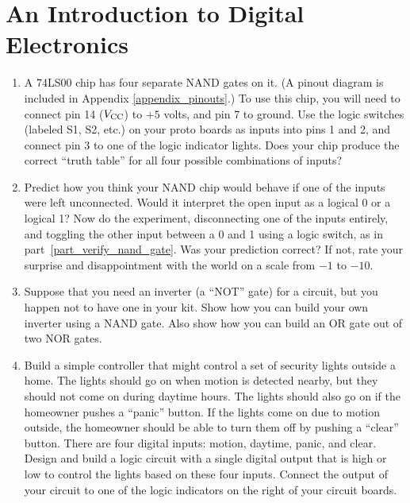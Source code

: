 \section{An Introduction to Digital Electronics}
\label{lab_digital_electronics}
\pagestyle{labfancy} %

\bigskip

\begin{enumerate}[wide]

\item A 74LS00 chip has four separate NAND gates on it.  (A pinout diagram is included in Appendix \ref{appendix_pinouts}.) To use this chip, you will need to connect pin 14 ($V_{\rm CC}$) to $+5$ volts, and pin 7 to ground.  Use the logic switches (labeled S1, S2, etc.) on your proto boards as inputs into pins 1 and 2, and connect pin 3 to one of the logic indicator lights.  Does your chip produce the correct ``truth table'' for all four possible combinations of inputs?\label{part_verify_nand_gate}

\item Predict how you think your NAND chip would behave if one of the inputs were left unconnected.  Would it interpret the open input as a logical 0 or a logical 1?  Now do the experiment, disconnecting one of the inputs entirely, and toggling the other input between a 0 and 1 using a logic switch, as in part~\ref{part_verify_nand_gate}.  Was your prediction correct?  If not, rate your surprise and disappointment with the world on a scale from $-1$ to $-10$. \label{part_open_digital_inputs}

\item Suppose that you need an inverter (a ``NOT'' gate) for a circuit, but you happen not to have one in your kit.  Show how you can build your own inverter using a NAND gate.  Also show how you can build an OR gate out of two NOR gates.

\item Build a simple controller that might control a set of security lights outside a home.  The lights should go on when motion is detected nearby, but they should not come on during daytime hours.  The lights should also go on if the homeowner pushes a ``panic'' button.  If the lights come on due to motion outside, the homeowner should be able to turn them off by pushing a ``clear'' button.  There are four digital inputs: motion, daytime, panic, and clear.  Design and build a logic circuit with a single digital output that is high or low to control the lights based on these four inputs.  Connect the output of your circuit to one of the logic indicators on the right of your circuit boards.


\end{enumerate}
